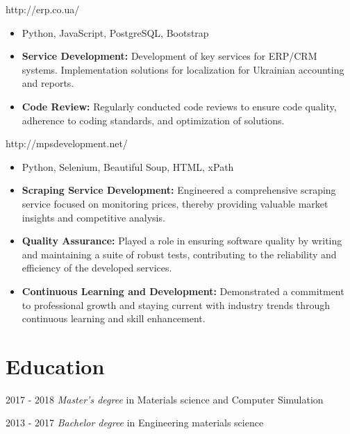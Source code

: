 \documentclass{resume}
\begin{document}

http://erp.co.ua/
\begin{itemize}
  \item Python, JavaScript, PostgreSQL, Bootstrap
  \item \textbf{Service Development:} Development of key services for ERP/CRM systems. Implementation solutions for localization for Ukrainian accounting and reports.
  \item \textbf{Code Review:} Regularly conducted code reviews to ensure code quality, adherence to coding standards, and optimization of solutions.
\end{itemize}


http://mpsdevelopment.net/

\begin{itemize}
  \item Python, Selenium, Beautiful Soup, HTML, xPath
  \item \textbf{Scraping Service Development:} Engineered a comprehensive scraping service focused on monitoring prices, thereby providing valuable market insights and competitive analysis.
  \item \textbf{Quality Assurance:} Played a role in ensuring software quality by writing and maintaining a suite of robust tests, contributing to the reliability and efficiency of the developed services.
  \item \textbf{Continuous Learning and Development:} Demonstrated a commitment to professional growth and staying current with industry trends through continuous learning and skill enhancement.
  
\end{itemize}

\section{Education}
 {2017 - 2018}
\textit{Master's degree} in Materials science and Computer Simulation

 {2013 - 2017}
\textit{Bachelor degree} in Engineering materials science 
\end{document}
